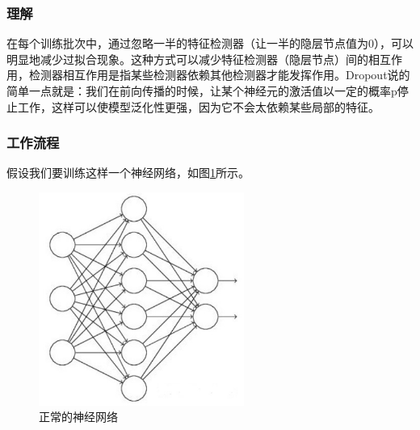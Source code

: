 \documentclass[UTF8]{ctexart}
\begin{document}
\subsubsection{理解}
在每个训练批次中，通过忽略一半的特征检测器（让一半的隐层节点值为0），可以明显地减少过拟合现象。这种方式可以减少特征检测器（隐层节点）间的相互作用，检测器相互作用是指某些检测器依赖其他检测器才能发挥作用。Dropout说的简单一点就是：我们在前向传播的时候，让某个神经元的激活值以一定的概率p停止工作，这样可以使模型泛化性更强，因为它不会太依赖某些局部的特征。
\subsubsection{工作流程}
假设我们要训练这样一个神经网络，如图\ref{dropout1}所示。
\begin{figure}[htb]
	\centering
	\includegraphics[width=0.6\textwidth]{figures/dropout1.jpg}
	\caption{正常的神经网络}
	\label{dropout1}
\end{figure}
\end{document}
